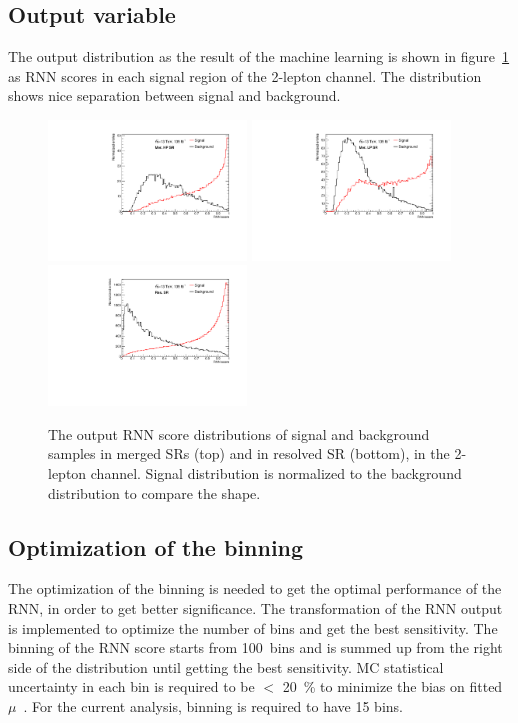 \subsection{Output variable}
The output distribution as the result of the machine learning is shown in figure~\ref{fig:RNNoutput} as RNN scores in each signal region of the 2-lepton channel.
The distribution shows nice separation between signal and background.
\begin{figure}[htbp]
    \centering
    \includegraphics[width=0.47\textwidth]{figures/RNN/ttV_0ptag1pfat0pjet_0ptv_SRVBS_HP_RNNScoreMerged.pdf}
    \includegraphics[width=0.47\textwidth]{figures/RNN/ttV_0ptag1pfat0pjet_0ptv_SRVBS_LP_RNNScoreMerged.pdf}
    \includegraphics[width=0.47\textwidth]{figures/RNN/ttV_0ptag2pjet_0ptv_SRVBS_Fid_RNNScoreResolved.pdf}
    \caption{ The output RNN score distributions of signal and background samples in merged SRs (top) and in resolved SR (bottom), in the 2-lepton channel. Signal distribution is normalized to the background distribution to compare the shape.
    }
    \label{fig:RNNoutput}
\end{figure}

\subsection{Optimization of the binning}
The optimization of the binning is needed to get the optimal performance of the RNN, in order to get better significance. 
The transformation of the RNN output \cite{ATL-PHYS-PUB-2019-009} is implemented to optimize the number of bins and get the best sensitivity.
The binning of the RNN score starts from 100~bins and is summed up from the right side of the distribution until getting the best sensitivity. 
MC statistical uncertainty in each bin is required to be $<$ 20~\% to minimize the bias on fitted $\mu$~\cite{ATL-PHYS-PUB-2019-009}. 
For the current analysis, binning is required to have 15 bins.